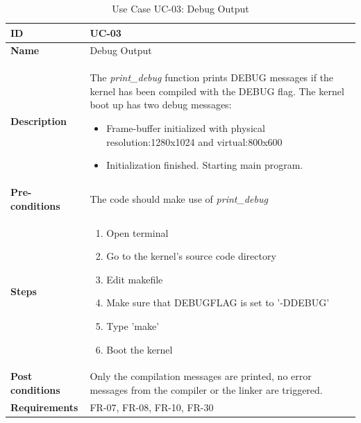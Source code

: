\begin{table}[H]
    \centering
    \begin{tabular}{| p{3cm} | p{7cm} |}
    \hline
    \textbf{ID}             & UC-03 \\ \hline
    \textbf{Name}           & Debug Output \\ \hline
    \textbf{Description}    & The \textit{print\_debug} function prints DEBUG messages if the kernel has been compiled with the DEBUG flag. The kernel boot up has two debug messages:
	\begin{itemize}
		\item Frame-buffer initialized with physical resolution:1280x1024 and virtual:800x600
		\item Initialization finished. Starting main program.
	\end{itemize}
	\\ \hline
    \textbf{Pre-conditions} &   The code should make use of \textit{print\_debug} \\ \hline
    \textbf{Steps}          &   \begin{enumerate}
                                    \item Open terminal
                                    \item Go to the kernel's source code directory
                                    \item Edit makefile
                                    \item Make sure that DEBUGFLAG is set to '-DDEBUG'
                                    \item Type 'make'
                                    \item Boot the kernel 
                                \end{enumerate}
 \\ \hline
    \textbf{Post conditions} & Only the compilation messages are printed, no error messages from the compiler or the linker are triggered. \\ \hline
    \textbf{Requirements}       &  FR-07, FR-08, FR-10, FR-30\\ \hline
    \end{tabular}
    \caption{Use Case UC-03: Debug Output}
\end{table}



